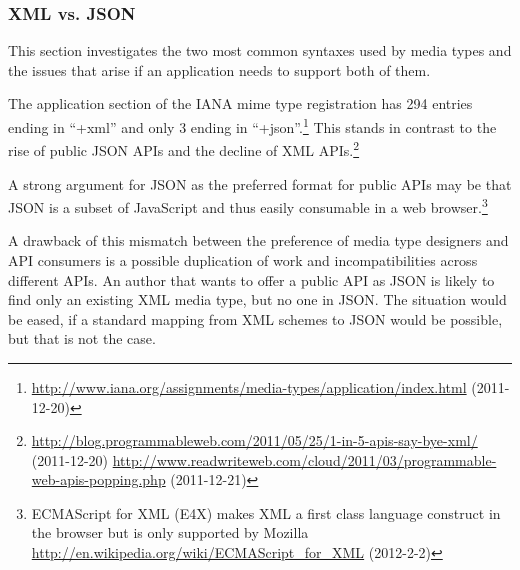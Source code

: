 \documentclass[12pt,a4paper,twoside]{scrartcl}		%
\newcommand{\citeurl}[2]{\url{#1} (#2)}
\begin{document}

\subsubsection{XML vs. JSON}


This section investigates the two most common syntaxes used by media types
and the issues that arise if an application needs to support both of them.

The application section of the IANA mime type registration has 294 entries
ending in ``+xml'' and only 3 ending in
``+json''.\footnote{\citeurl{http://www.iana.org/assignments/media-types/application/index.html}{2011-12-20}}
This stands in contrast to the rise of public JSON APIs and the decline of XML
APIs.\footnote{\citeurl{http://blog.programmableweb.com/2011/05/25/1-in-5-apis-say-bye-xml/}{2011-12-20} \citeurl{http://www.readwriteweb.com/cloud/2011/03/programmable-web-apis-popping.php}{2011-12-21}}

A strong argument for JSON as the preferred format for public APIs may be that
JSON is a subset of JavaScript and thus easily consumable in a web
browser.\footnote{ECMAScript for XML (E4X) makes XML a first class language
  construct in the browser but is only supported by Mozilla
  \citeurl{http://en.wikipedia.org/wiki/ECMAScript_for_XML}{2012-2-2}}

A drawback of this mismatch between the preference of media type designers and
API consumers is a possible duplication of work and incompatibilities across
different APIs. An author that wants to offer a public API as JSON is likely to
find only an existing XML media type, but no one in JSON.  The situation would
be eased, if a standard mapping from XML schemes to JSON would be possible, but
that is not the case.
\end{document}
